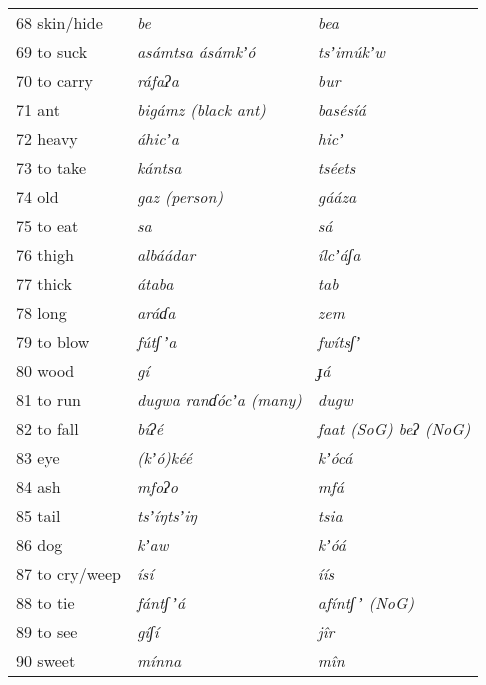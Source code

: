 \documentclass[output=paper]{langsci/langscibook}
\begin{document}
\begin{longtable}{p{}  >{\itshape}p{} >{\itshape}p{}}
68 skin/hide & be & bea \\

69 to suck & asámtsa   ásámkʼ\'{o} & tsʼim\'{u}kʼw \\

70 to carry & ráfaʔa & bur \\

71 ant & bigámz    \textup{(black ant)} & basésíá \\

72 heavy & áhicʼa & hicʼ \\

73 to take & kántsa & tséets \\

74 old & gaz   \textup{(person)} & gááza \\

75 to eat & sa & sá \\

76 thigh & albáádar & ílcʼáʃa \\

77 thick & átaba & tab \\

78 long & aráɗa & zem \\

79 to blow & f\'{u}tʃ\,ʼa & fwítsʃʼ \\

80 wood & gí & ɟá \\

81 to run & dugwa     ranɗ\'{o}cʼa   \textup{(many)} & dugw \\

82 to fall & bíʔé & faat \textup{(SoG)}   beʔ \textup{(NoG)} \\

83 eye & (kʼ\'{o})kéé & kʼ\'{o}cá \\

84 ash & mfoʔo & mfá \\

85 tail & tsʼíŋtsʼiŋ & tsia \\

86 dog & kʼaw & kʼ\'{o}á \\

87 to cry/weep & ísí & íís \\

88 to tie & fántʃ\,ʼá & afíntʃ\,ʼ \textup{(NoG)} \\

89 to see & gíʃí & j\^{i}r \\

90 sweet & mínna & m\^{i}n \\


\end{longtable}
\end{document}
